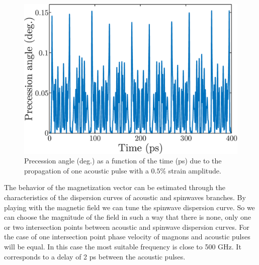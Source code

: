 \documentclass[%
superscriptaddress,
preprint,
showpacs,
amsmath,
amssymb,
aps,
prl,
]{revtex4-1}
\begin{document}
\begin{figure}
    \centering
    \includegraphics[width = 0.95\columnwidth]{Figures/precessionAngle05.eps}
    \caption{Precession angle (deg.) as a function of the time (ps) due to the propagation of one acoustic pulse with a $0.5\%$ strain amplitude.}
    \label{fig:precessionAngle05}
\end{figure}

The behavior of the magnetization vector can be estimated through the characteristics of the dispersion curves of acoustic and spinwaves branches. By playing with the magnetic field we can tune the spinwave dispersion curve. So we can choose the magnitude of the field in such a way that there is none, only one or two intersection points between acoustic and spinwave dispersion curves. For the case of one intersection point phase velocity of magnons and acoustic pulses will be equal. In this case the most suitable frequency is close to 500 GHz. It corresponds to a delay of 2 ps between the acoustic pulses.
	
\end{document}
